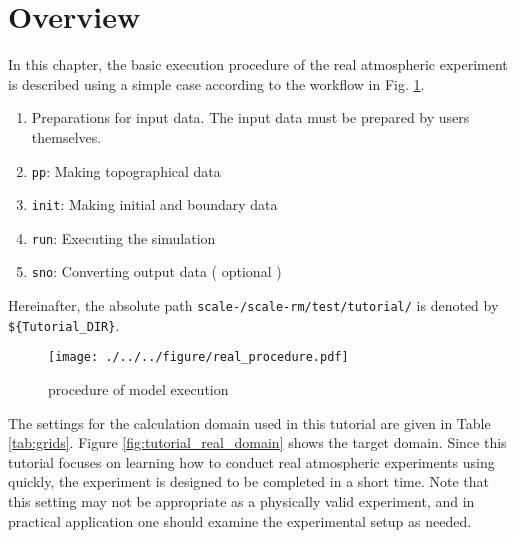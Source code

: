 \section{Overview} \label{sec:tutorial_real_intro}
In this chapter, the basic execution procedure of the real atmospheric experiment is described using a simple case according to the workflow in Fig. \ref{fig:howto}.
\begin{enumerate}
\item Preparations for input data. The input data must be prepared by users themselves.
\item \texttt{pp}:   Making topographical data
\item \texttt{init}: Making initial and boundary data
\item \texttt{run}:  Executing the simulation
\item \texttt{sno}:  Converting {\netcdf} output data ( optional )
\end{enumerate}
Hereinafter, the absolute path \texttt{scale-{\version}/scale-rm/test/tutorial/} is denoted by\\
\verb|${Tutorial_DIR}|.

\begin{figure}[tb]
\begin{center}
  \texttt{[image: ./../../figure/real\_procedure.pdf]}\\
  \caption{\scalerm procedure of model execution}
  \label{fig:howto}
\end{center}
\end{figure}

The settings for the calculation domain used in this tutorial are given in Table \ref{tab:grids}.
Figure \ref{fig:tutorial_real_domain} shows the target domain.
Since this tutorial focuses on learning how to conduct 
real atmospheric experiments using \scalerm quickly,
the experiment is designed to be completed in a short time.
Note that this setting may not be appropriate as a physically valid experiment, 
and in practical application one should examine the experimental setup as needed.

